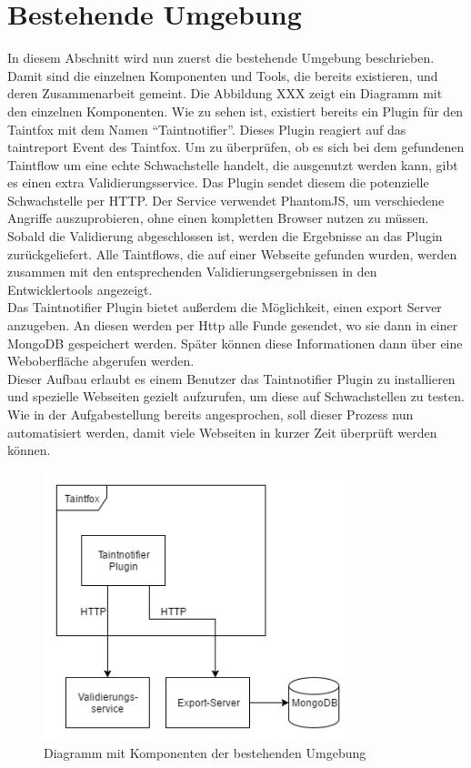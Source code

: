 \section{Bestehende Umgebung}
In diesem Abschnitt wird nun zuerst die bestehende Umgebung beschrieben. Damit sind die einzelnen Komponenten und Tools, die bereits existieren, und deren Zusammenarbeit gemeint. Die Abbildung XXX zeigt ein Diagramm mit den einzelnen Komponenten. Wie zu sehen ist, existiert bereits ein Plugin für den Taintfox mit dem Namen \enquote{Taintnotifier}. Dieses Plugin reagiert auf das taintreport Event des Taintfox. Um zu überprüfen, ob es sich bei dem gefundenen Taintflow um eine echte Schwachstelle handelt, die ausgenutzt werden kann, gibt es einen extra Validierungsservice. Das Plugin sendet diesem die potenzielle Schwachstelle per HTTP. Der Service verwendet PhantomJS, um verschiedene Angriffe auszuprobieren, ohne einen kompletten Browser nutzen zu müssen. Sobald die Validierung abgeschlossen ist, werden die Ergebnisse an das Plugin zurückgeliefert. Alle Taintflows, die auf einer Webseite gefunden wurden, werden zusammen mit den entsprechenden Validierungsergebnissen in den Entwicklertools angezeigt. \\
Das Taintnotifier Plugin bietet außerdem die Möglichkeit, einen export Server anzugeben. An diesen werden per Http alle Funde gesendet, wo sie dann in einer MongoDB gespeichert werden. Später können diese Informationen dann über eine Weboberfläche abgerufen werden. \\
Dieser Aufbau erlaubt es einem Benutzer das Taintnotifier Plugin zu installieren und spezielle Webseiten gezielt aufzurufen, um diese auf Schwachstellen zu testen. Wie in der Aufgabestellung bereits angesprochen, soll dieser Prozess nun automatisiert werden, damit viele Webseiten in kurzer Zeit überprüft werden können.

\begin{figure}[H]
	\centering
		\includegraphics[width=0.8\textwidth]{Bilder/AlteUmgebung.png}
	\caption{Diagramm mit Komponenten der bestehenden Umgebung}
\end{figure}

